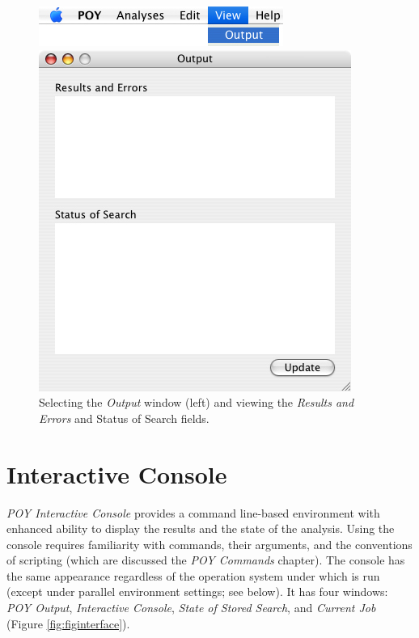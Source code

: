 \begin{figure}
\centering
\begin{minipage}[c]{0.48\textwidth}
   		\includegraphics[width=\textwidth]{figures/view_menu.jpg}
\end{minipage}
\quad
\begin{minipage}[c]{0.48\textwidth}
	   	\includegraphics[width=\textwidth]{figures/output_window.jpg}
   	\end{minipage}
\caption{Selecting the \emph{Output} window (left) and viewing the \emph{Results and Errors} and  {Status of Search} fields.}
\label{fig:results_and_status_windows}
\end{figure}

\section{\poy Interactive Console}

\emph{POY Interactive Console} provides a command line-based environment with enhanced ability to display the results and the state of the analysis. Using the console requires familiarity with \poy commands, their arguments, and the conventions of \poy scripting (which are discussed the \emph{POY Commands} chapter). The console has the same appearance regardless of the operation system under which \poy is run (except under parallel environment settings; see below). It has four windows: \emph{POY Output}, \emph{Interactive Console}, \emph{State of Stored Search}, and \emph{Current Job} (Figure \ref{fig:figinterface}).

